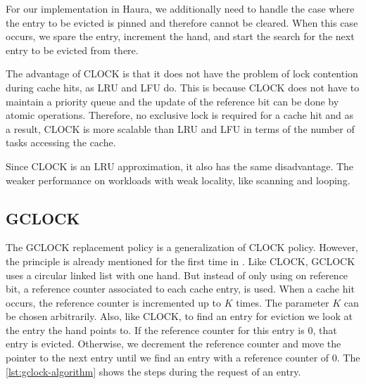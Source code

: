 \documentclass[
	12pt,
	a4paper,
	abstract,
	bibliography=totoc,
	chapterprefix,
	headings=openright,
	numbers=endperiod,
	parskip=half,
	twoside,
]{scrreprt}
\begin{document}
For our implementation in Haura, we additionally need to handle the case where the entry to be 
evicted is pinned and therefore cannot be cleared.
When this case occurs, we spare the entry, increment the hand, and start the search for the next entry to be evicted from there.

The advantage of CLOCK is that it does not have the problem of lock contention during cache hits, as LRU and LFU do.
This is because CLOCK does not have to maintain a priority queue and 
the update of the reference bit can be done by atomic operations. 
Therefore, no exclusive lock is required for a cache hit and 
as a result, CLOCK is more scalable than LRU and LFU in terms of 
the number of tasks accessing the cache.

Since CLOCK is an LRU approximation, it also has the same disadvantage.
The weaker performance on workloads with weak locality, like scanning and looping.

\subsection{GCLOCK}

The GCLOCK replacement policy \cite{smith1978sequentiality} is a generalization of CLOCK policy.
However, the principle is already mentioned for the first time in \cite{corbato1968paging}.
Like CLOCK, GCLOCK uses a circular linked list with one hand.
But instead of only using on reference bit, a reference counter associated to each cache entry, is used.
When a cache hit occurs, the reference counter is incremented up to $K$ times.
The parameter $K$ can be chosen arbitrarily.
Also, like CLOCK, to find an entry for eviction we look at the entry the hand points to.
If the reference counter for this entry is 0, that entry is evicted.
Otherwise, we decrement the reference counter and move the pointer to the next entry 
until we find an entry with a reference counter of 0.
The \cref{lst:gclock-algorithm} shows the steps during the request of an entry.

\bigskip
\end{document}

